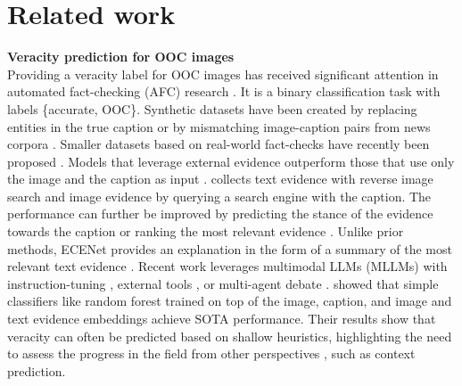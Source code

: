 \section{Related work}
\textbf{Veracity prediction for OOC images}\\
Providing a veracity label for OOC images has received significant attention in automated fact-checking (AFC) research \citep{akhtar-etal-2023-multimodal}. It is a binary classification task with labels \{accurate, OOC\}. Synthetic datasets have been created by replacing entities in the true caption \citep{10.1145/3240508.3240707,10.1145/3372278.3390670}   or by mismatching image-caption pairs from news corpora  \citep{luo-etal-2021-newsclippings}. 
Smaller datasets based on real-world fact-checks have recently been proposed \citep{aneja2023cosmos,papadopoulos2024verite,pham2024ookpik}. Models that leverage external evidence outperform those that use only the image and the caption as input \citep{luo-etal-2021-newsclippings,zhang2023interpretable}. \citet{Abdelnabi_2022_CVPR} collects text evidence with reverse image search and image evidence by querying a search engine with the caption. The performance can further be improved by predicting the stance of the evidence towards the caption \citep{yuan-etal-2023-support} or ranking the most relevant evidence \citep{papadopoulos2023red}. Unlike prior methods, ECENet provides an explanation in the form of a summary of the most relevant text evidence \citep{10.1145/3581783.3612183}. Recent work leverages multimodal LLMs (MLLMs) with instruction-tuning \citep{Qi_2024_CVPR}, external tools \citep{braun2024defamedynamicevidencebasedfactchecking}, or multi-agent debate \citep{lakara2024madsherlockmultiagentdebatesoutofcontext}.  
\citet{papadopoulos2024similarity} showed that simple classifiers like random forest trained on top of the image, caption, and image and text evidence embeddings achieve SOTA performance. Their results show that veracity can often be predicted based on shallow heuristics, highlighting the need to assess the progress in the field from other perspectives \citep{papadopoulos2024similarity}, such as context prediction.\\

